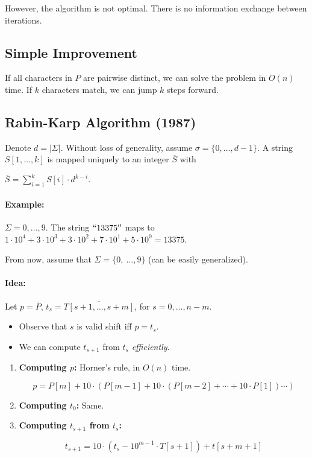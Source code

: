 However, the algorithm is not optimal. There is no information exchange between iterations.

\subsection{Simple Improvement}

If all characters in $P$ are pairwise distinct, we can solve the problem in $O(n)$ time. If $k$ characters match, we can jump $k$ steps forward.

\subsection{Rabin-Karp Algorithm (1987)}

Denote $d = |\Sigma|$. Without loss of generality, assume $\sigma = \{0, \ldots, d-1\}$. A string $S[1,\ldots,k]$ is mapped uniquely to an integer $\overline{S}$ with

$\overline{S} = \sum\limits_{i=1}^k S[i] \cdot d^{k-i}.$

\paragraph{Example:} $\Sigma={0,\ldots, 9}$. The string $``13375''$ maps to $1\cdot 10^4 + 3 \cdot 10^3 + 3 \cdot 10^2 + 7 \cdot 10^1 + 5 \cdot 10^0 = 13375$.

From now, assume that $\Sigma = \{0,\ \ldots, 9\}$ (can be easily generalized).

\paragraph{Idea:} Let $p = \overline{P}$, $t_s = \overline{T[s+1, \ldots, s+m]}$, for $s = 0, \ldots, n-m$.
	\begin{itemize}
		\item Observe that $s$ is valid shift iff $p = t_s$.
		\item We can compute $t_{s+1}$ from $t_s$ \emph{efficiently}.
	\end{itemize}

\begin{enumerate}
	\item \textbf{Computing $p$:} Horner's rule, in $O(n)$ time.
	
	$$p = P[m] + 10 \cdot (P[m-1] + 10\cdot(P[m-2] + \cdots + 10 \cdot P[1]) \cdots)$$
	
	\item \textbf{Computing $t_0$:} Same.
	\item \textbf{Computing $t_{s+1}$ from $t_s$:}
	
	$$t_{s+1} = 10\cdot(t_s - 10^{m-1} \cdot T[s+1]) + t[s + m + 1]$$
\end{enumerate}

